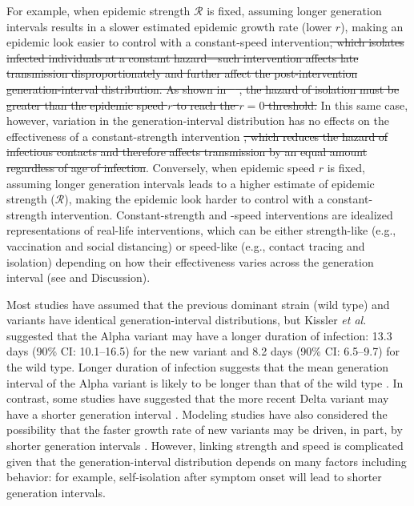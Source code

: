 \documentclass[12pt]{article}
\newcommand{\RR}{\ensuremath{{\mathcal R}}\xspace}
\providecommand{\DIFaddtex}[1]{{\protect\color{blue}\uwave{#1}}} %
\providecommand{\DIFdeltex}[1]{{\protect\color{red}\sout{#1}}}                      %
\providecommand{\DIFaddbegin}{} %
\providecommand{\DIFaddend}{} %
\providecommand{\DIFdelbegin}{} %
\providecommand{\DIFdelend}{} %
\providecommand{\DIFadd}[1]{\texorpdfstring{\DIFaddtex{#1}}{#1}} %
\providecommand{\DIFdel}[1]{\texorpdfstring{\DIFdeltex{#1}}{}} %
\newcommand{\DIFscaledelfig}{0.5}
\newlength{\DIFdelgraphicswidth} %
\newlength{\DIFdelgraphicsheight} %
\newcommand{\DIFaddincludegraphics}[2][]{{\color{blue}\fbox{\DIFOincludegraphics[#1]{#2}}}} %
\newcommand{\DIFdelincludegraphics}[2][]{%
\sbox{\DIFdelgraphicsbox}{\DIFOincludegraphics[#1]{#2}}%
\settoboxwidth{\DIFdelgraphicswidth}{\DIFdelgraphicsbox} %
\settoboxtotalheight{\DIFdelgraphicsheight}{\DIFdelgraphicsbox} %
\scalebox{\DIFscaledelfig}{%
\parbox[b]{\DIFdelgraphicswidth}{\usebox{\DIFdelgraphicsbox}\\[-\baselineskip] \rule{\DIFdelgraphicswidth}{0em}}\llap{\resizebox{\DIFdelgraphicswidth}{\DIFdelgraphicsheight}{%
\setlength{\unitlength}{\DIFdelgraphicswidth}%
\begin{picture}(1,1)%
\thicklines\linethickness{2pt} %
{\color[rgb]{1,0,0}\put(0,0){\framebox(1,1){}}}%
{\color[rgb]{1,0,0}\put(0,0){\line( 1,1){1}}}%
{\color[rgb]{1,0,0}\put(0,1){\line(1,-1){1}}}%
\end{picture}%
}\hspace*{3pt}}} %
} %
\DeclareRobustCommand{\DIFaddbegin}{\DIFOaddbegin \let\includegraphics\DIFaddincludegraphics} %
\DeclareRobustCommand{\DIFaddend}{\DIFOaddend \let\includegraphics\DIFOincludegraphics} %
\DeclareRobustCommand{\DIFdelbegin}{\DIFOdelbegin \let\includegraphics\DIFdelincludegraphics} %
\DeclareRobustCommand{\DIFdelend}{\DIFOaddend \let\includegraphics\DIFOincludegraphics} %
\begin{document}
For example, when epidemic strength $\RR$ is fixed, assuming longer generation intervals results in a slower estimated epidemic growth rate (lower $r$), making an epidemic look easier to control with a constant-speed intervention\DIFdelbegin \DIFdel{, which isolates infected individuals at a constant hazard---such intervention affects late transmission disproportionately and further affect the post-intervention generation-interval distribution.
As shown in \mbox{%
\cite{doi:10.1098/rspb.2020.1556}}\hspace{0pt}%
, the hazard of isolation must be greater than the epidemic speed $r$ to reach the $r=0$ threshold.
}\DIFdelend \DIFaddbegin \DIFadd{.
}\DIFaddend In this same case, however, variation in the generation-interval distribution has no effects on the effectiveness of a constant-strength intervention \DIFdelbegin \DIFdel{, which reduces the hazard of infectious contacts and therefore affects transmission by an equal amount regardless of age of infection}\DIFdelend \DIFaddbegin \DIFadd{because $\RR$ is fixed}\DIFaddend .
Conversely, when epidemic speed $r$ is fixed, assuming longer generation intervals leads to a higher estimate of epidemic strength ($\RR$), making the epidemic look harder to control with a constant-strength intervention.
Constant-strength and -speed interventions are idealized representations of real-life interventions, which can be either strength-like (e.g., vaccination and social distancing) or speed-like (e.g., contact tracing and isolation) depending on how their effectiveness varies across the generation interval (see \cite{doi:10.1098/rspb.2020.1556} and Discussion).

Most studies have assumed that the previous dominant strain (wild type) and variants have identical generation-interval distributions, but Kissler \textit{et al.} \citep{kissler2021densely} suggested that the Alpha variant may have a longer duration of infection: 13.3 days (90\% CI: 10.1--16.5) for the new variant and 8.2 days (90\% CI: 6.5--9.7) for the wild type.
Longer duration of infection suggests that the mean generation interval of the Alpha variant is likely to be longer than that of the wild type \citep{lloyd2001realistic,wearing2005appropriate,roberts2007model}.
In contrast, some studies have suggested that the more recent Delta variant may have a shorter generation interval \citep{li2021viral,zhang2021transmission}.
Modeling studies have also considered the possibility that the faster growth rate of new variants may be driven, in part, by shorter generation intervals \citep{davies2021estimated,volz2021transmission}.
However, linking strength and speed is complicated given that the generation-interval distribution depends on many factors including behavior:
for example, self-isolation after symptom onset will lead to shorter generation intervals.
\end{document}

